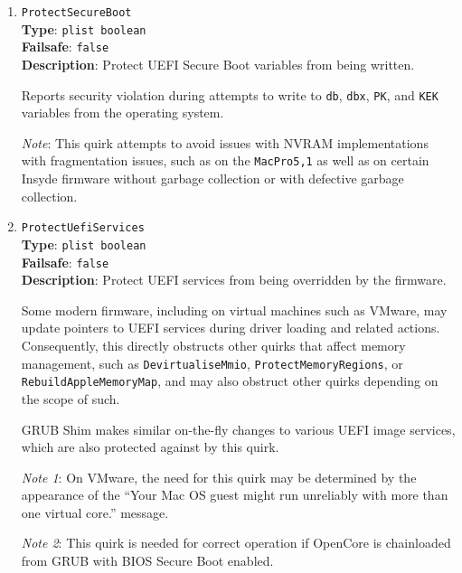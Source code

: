 \documentclass[]{article}
\begin{document}
\begin{enumerate}
  This quirk attempts to fix the types of these regions, e.g. ACPI NVS for
  CSM or MMIO for MMIO.

  \emph{Note}: The need for this quirk is determined by artifacts, sleep
  wake issues, and boot failures. This quirk is typically only required by
  very old firmware.

\item
  \texttt{ProtectSecureBoot}\\
  \textbf{Type}: \texttt{plist\ boolean}\\
  \textbf{Failsafe}: \texttt{false}\\
  \textbf{Description}: Protect UEFI Secure Boot variables from being written.

  Reports security violation during attempts to write to \texttt{db}, \texttt{dbx},
  \texttt{PK}, and \texttt{KEK} variables from the operating system.

  \emph{Note}: This quirk attempts to avoid issues with NVRAM implementations with
  fragmentation issues, such as on the \texttt{MacPro5,1} as well as on certain
  Insyde firmware without garbage collection or with defective garbage collection.

\item
  \texttt{ProtectUefiServices}\\
  \textbf{Type}: \texttt{plist\ boolean}\\
  \textbf{Failsafe}: \texttt{false}\\
  \textbf{Description}: Protect UEFI services from being overridden by the firmware.

  Some modern firmware, including on virtual machines such as VMware,
  may update pointers to UEFI services during driver loading and related actions.
  Consequently, this directly obstructs other quirks that affect memory management,
  such as \texttt{DevirtualiseMmio}, \texttt{ProtectMemoryRegions}, or \texttt{RebuildAppleMemoryMap},
  and may also obstruct other quirks depending on the scope of such.

  GRUB Shim makes similar on-the-fly changes to various UEFI image services,
  which are also protected against by this quirk.

  \emph{Note 1}: On VMware, the need for this quirk may be determined by the appearance of the
  ``Your Mac OS guest might run unreliably with more than one virtual core.'' message.

  \emph{Note 2}: This quirk is needed for correct operation if OpenCore is chainloaded from GRUB
  with BIOS Secure Boot enabled.


\end{enumerate}
\end{document}
